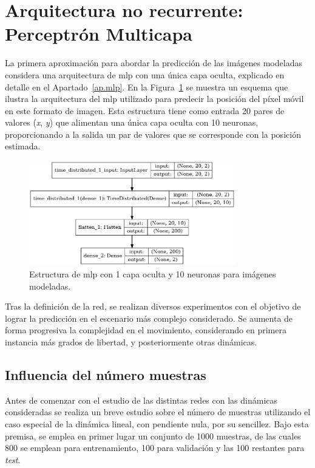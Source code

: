 \section{Arquitectura no recurrente: Perceptrón Multicapa}
La primera aproximación para abordar la predicción de las imágenes modeladas considera una arquitectura de \acrshort{mlp} con una única capa oculta, explicado en detalle en el Apartado~\ref{ap.mlp}. En la Figura~\ref{fig.norec_simple_mod} se muestra un esquema que ilustra la arquitectura del \acrshort{mlp} utilizado para predecir la posición del píxel móvil en este formato de imagen. Esta estructura tiene como entrada 20 pares de valores (\textit{x}, \textit{y}) que alimentan una única capa oculta con 10 neuronas, proporcionando a la salida un par de valores que se corresponde con la posición estimada.\\

\begin{figure}[H]
		\begin{center}
			\includegraphics[width=0.8\textwidth]{ figures/net/NOREC_simple_mod.png}
			\caption{Estructura de \acrshort{mlp} con 1 capa oculta y 10 neuronas para imágenes modeladas.}
			\label{fig.norec_simple_mod}
		\end{center}
\end{figure}
\vspace{-10pt}

Tras la definición de la red, se realizan diversos experimentos con el objetivo de lograr la predicción en el escenario más complejo considerado. Se aumenta de forma progresiva la complejidad en el movimiento, considerando en primera instancia más grados de libertad, y posteriormente otras dinámicas.

\subsection{Influencia del número muestras}\label{ap.muestras}
Antes de comenzar con el estudio de las distintas redes con las dinámicas consideradas se realiza un breve estudio sobre el número de muestras utilizando el caso especial de la dinámica lineal, con pendiente nula, por su sencillez. Bajo esta premisa, se emplea en primer lugar un conjunto de 1000 muestras, de las cuales 800 se emplean para entrenamiento, 100 para validación y las 100 restantes para \textit{test}.\\

